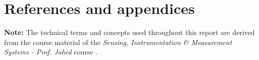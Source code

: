 \documentclass[12pt,a4paper]{article}
\begin{document}
\section{References and appendices}
\label{sec:ref_and_appx}

\textbf{Note:}
 The technical terms and concepts used throughout this report are derived from the course material of the \emph{Sensing, Instrumentation \& Measurement Systems - Prof. Jahed} course .
\end{document}
